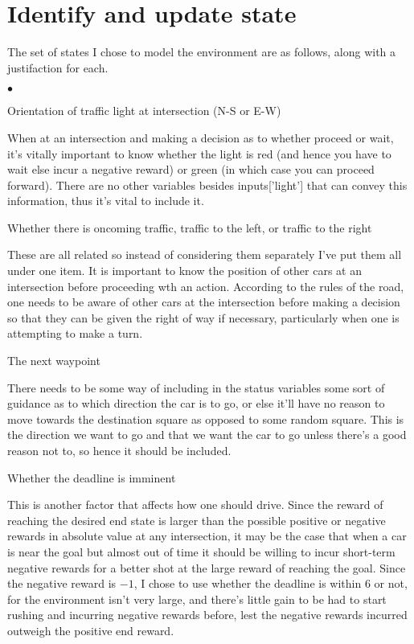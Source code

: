 \documentclass{amsart}
\begin{document}
\section{Identify and update state}
The set of states I chose to model the environment are as follows, along with a justifaction for each.
\begin{list}{$\bullet$}{\addtolength{\parsep}{1mm}}
	\item Orientation of traffic light at intersection (N-S or E-W)
	
	When at an intersection and making a decision as to whether proceed or wait, it's vitally important to know whether the light is red (and hence you have to wait else incur a negative reward) or green (in which case you can proceed forward).  There are no other variables besides inputs['light'] that can convey this information, thus it's vital to include it.

	\item Whether there is oncoming traffic, traffic to the left, or traffic to the right

	These are all related so instead of considering them separately I've put them all under one item.  It  is important to know the position of other cars at an intersection before proceeding wth an action.  According to the rules of the road, one needs to be aware of other cars at the intersection before making a decision so that they can be given the right of way if necessary, particularly when one is attempting to make a turn.

	\item The next waypoint

	There needs to be some way of including in the status variables some sort of guidance as to which direction the car is to go, or else it'll have no reason to move towards the destination square as opposed to some random square.  This is the direction we want to go and that we want the car to go unless there's a good reason not to, so hence it should be included.

	\item Whether the deadline is imminent
	
	This is another factor that affects how one should drive.  Since the reward of reaching the desired end state is larger than the possible positive or negative rewards in absolute value at any intersection, it may be the case that when a car is near the goal but almost out of time it should be willing to incur short-term negative rewards for a better shot at the large reward of reaching the goal.  Since the negative reward is $-1$, I chose to use whether the deadline is within 6 or not, for the environment isn't very large, and there's little gain to be had to start rushing and incurring negative rewards before, lest the negative rewards incurred outweigh the positive end reward.
	

\end{list}
\end{document}

